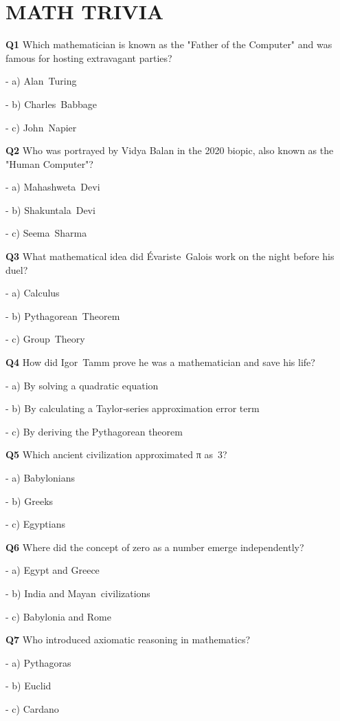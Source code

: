 \section{MATH TRIVIA}

\textbf{Q1} Which mathematician is known as the "Father of the Computer" and was famous for hosting extravagant parties?\par
\quad - a) Alan Turing\par
\quad - b) Charles Babbage\par
\quad - c) John Napier\par

\textbf{Q2} Who was portrayed by Vidya Balan in the 2020 biopic, also known as the "Human Computer"?\par
\quad - a) Mahashweta Devi\par
\quad - b) Shakuntala Devi\par
\quad - c) Seema Sharma\par

\textbf{Q3} What mathematical idea did Évariste Galois work on the night before his duel?\par
\quad - a) Calculus\par
\quad - b) Pythagorean Theorem\par
\quad - c) Group Theory\par

\textbf{Q4} How did Igor Tamm prove he was a mathematician and save his life?\par
\quad - a) By solving a quadratic equation\par
\quad - b) By calculating a Taylor‑series approximation error term\par
\quad - c) By deriving the Pythagorean theorem\par

\textbf{Q5} Which ancient civilization approximated π as 3?\par
\quad - a) Babylonians\par
\quad - b) Greeks\par
\quad - c) Egyptians\par

\textbf{Q6} Where did the concept of zero as a number emerge independently?\par
\quad - a) Egypt and Greece\par
\quad - b) India and Mayan civilizations\par
\quad - c) Babylonia and Rome\par

\textbf{Q7} Who introduced axiomatic reasoning in mathematics?\par
\quad - a) Pythagoras\par
\quad - b) Euclid\par
\quad - c) Cardano\par

